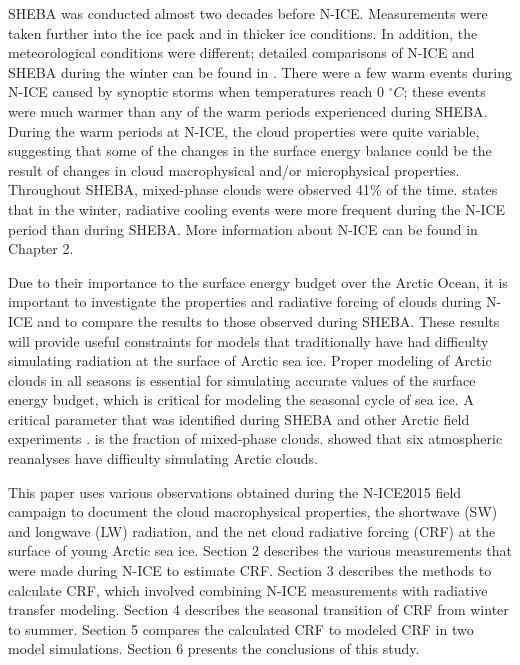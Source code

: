 SHEBA was conducted almost two decades before N-ICE. Measurements were taken further into the ice pack \citep{cohen:2017} and in thicker ice conditions. In addition, the meteorological conditions were different; detailed comparisons of N-ICE and SHEBA during the winter can be found in \citep{graham:2017}. There were a few warm events during N-ICE caused by synoptic storms when temperatures reach 0 $^{\circ}C$; these events were much warmer than any of the warm periods experienced during SHEBA.  During the warm periods at N-ICE, the cloud properties were quite variable, suggesting that some of the changes in the surface energy balance could be the result of changes in cloud macrophysical and/or microphysical properties. Throughout SHEBA, mixed-phase clouds were observed 41$\%$ of the time. \citet{graham:2017} states that in the winter, radiative cooling events were more frequent during the N-ICE period than during SHEBA. More information about N-ICE can be found in Chapter 2.

Due to their importance to the surface energy budget over the Arctic Ocean, it is important to investigate the properties and radiative forcing of clouds during N-ICE and to compare the results to those observed during SHEBA. These results will provide useful constraints for models that traditionally have had difficulty simulating radiation at the surface of Arctic sea ice. Proper modeling of Arctic clouds in all seasons is essential for simulating accurate values of the surface energy budget, which is critical for modeling the seasonal cycle of sea ice. A critical parameter that was identified during SHEBA \citep{inoue:2008, tjernstrom:2005} and other Arctic field experiments \citep{hines:2017, listowski:2017, hines:2019}. is the fraction of mixed-phase clouds. \citet{graham:2017} showed that six atmospheric reanalyses have difficulty simulating Arctic clouds.

This paper uses various observations obtained during the N-ICE2015 field campaign to document the cloud macrophysical properties, the shortwave (SW) and longwave (LW) radiation, and the net cloud radiative forcing (CRF) at the surface of young Arctic sea ice. Section 2 describes the various measurements that were made during N-ICE to estimate CRF. Section 3 describes the methods to calculate CRF, which involved combining N-ICE measurements with radiative transfer modeling. Section 4 describes the seasonal transition of CRF from winter to summer. Section 5 compares the calculated CRF to modeled CRF in two model simulations. Section 6 presents the conclusions of this study.

